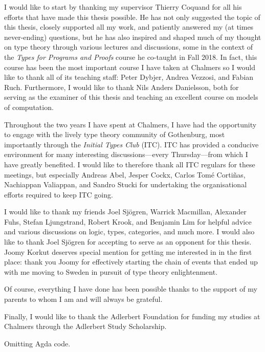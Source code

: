 \begin{acknowledgements}
  I would like to start by thanking my supervisor Thierry Coquand for all his efforts that
  have made this thesis possible. He has not only suggested the topic of this thesis,
  closely supported all my work, and patiently answered my (at times never-ending)
  questions, but he has also inspired and shaped much of my thought on type theory through
  various lectures and discussions, some in the context of the \emph{Types for Programs
  and Proofs} course he co-taught in Fall 2018. In fact, this course has been the most
  important course I have taken at Chalmers so I would like to thank all of its teaching
  staff: Peter Dybjer, Andrea Vezzosi, and Fabian Ruch. Furthermore, I would like to thank
  Nils Anders Danielsson, both for serving as the examiner of this thesis and teaching an
  excellent course on models of computation.

  Throughout the two years I have spent at Chalmers, I have had the opportunity to engage
  with the lively type theory community of Gothenburg, most importantly through
  the \emph{Initial Types Club} (ITC). ITC has provided a conducive environment for many
  interesting discussions---every Thursday---from which I have greatly benefited. I would like
  to therefore thank all ITC regulars for these meetings, but especially Andreas Abel,
  Jesper Cockx, Carlos Tomé Cortiñas, Nachiappan Valiappan, and Sandro Stucki for
  undertaking the organisational efforts required to keep ITC going.

  I would like to thank my friends Joel Sjögren, Warrick Macmillan, Alexander Fuhs, Stefan
  Ljung\-strand, Robert Krook, and Benjamin Lim for helpful advice and various discussions
  on logic, types, categories, and much more. I would also like to thank Joel Sjögren for
  accepting to serve as an opponent for this thesis. Joomy Korkut deserves special mention
  for getting me interested in \veragda{} in the first place: thank you Joomy for
  effectively starting the chain of events that ended up with me moving to Sweden in
  pursuit of type theory enlightenment.

  Of course, everything I have done has been possible thanks to the support of my parents
  to whom I am and will always be grateful.

  Finally, I would like to thank the Adlerbert Foundation for funding my studies at
  Chalmers through the Adlerbert Study Scholarship.
\end{acknowledgements}

\makelists{}













\makebackmatter{}

\ifdefined\omitagdainappendix
  Omitting Agda code.
\else

\fi


